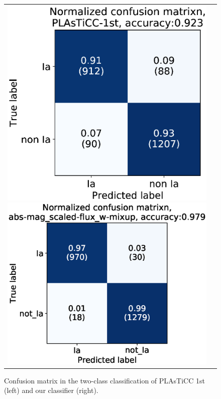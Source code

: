 \documentclass[useamsfonts]{pasj01}
\begin{document}
\begin{figure}[ht]
    \begin{tabular}{cc}
        \begin{minipage}{0.5\hsize}
            \begin{center}
                \includegraphics[width=\columnwidth]{figures/07_CM_PLAsTiCC-1st_submission_aug22_2class_2.eps}
            \end{center}
        \end{minipage}
        \begin{minipage}{0.5\hsize}
            \begin{center}
                \includegraphics[width=\columnwidth]{figures/03_CM_abs-mag_scaled-flux_w-mixup_predictions_test_2.eps}
            \end{center}
        \end{minipage}
    \end{tabular}  \caption{%
    Confusion matrix in the two-class classification of PLAsTiCC 1st (left) and our classifier (right).
    }%
    \label{fig:comp_plasticc_1st}
\end{figure}
%
%
\end{document}
